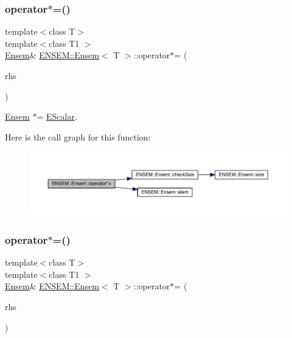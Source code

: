 \subsubsection{\texorpdfstring{operator$\ast$=()}{operator*=()}\hspace{0.1cm}{\footnotesize\ttfamily [1/4]}}
{\footnotesize\ttfamily template$<$class T$>$ \\
template$<$class T1 $>$ \\
\mbox{\hyperlink{classENSEM_1_1Ensem}{Ensem}}\& \mbox{\hyperlink{classENSEM_1_1Ensem}{E\+N\+S\+E\+M\+::\+Ensem}}$<$ T $>$\+::operator$\ast$= (\begin{DoxyParamCaption}\item[{const \mbox{\hyperlink{classENSEM_1_1EScalar}{E\+Scalar}}$<$ T1 $>$ \&}]{rhs }\end{DoxyParamCaption})\hspace{0.3cm}{\ttfamily [inline]}}



\mbox{\hyperlink{classENSEM_1_1Ensem}{Ensem}} $\ast$= \mbox{\hyperlink{classENSEM_1_1EScalar}{E\+Scalar}}. 

Here is the call graph for this function\+:
\nopagebreak
\begin{figure}[H]
\begin{center}
\leavevmode
\includegraphics[width=350pt]{d7/d3e/classENSEM_1_1Ensem_abacb93dfca393ddb29f317d35e2fff7f_cgraph}
\end{center}
\end{figure}
\mbox{\label{classENSEM_1_1Ensem_abacb93dfca393ddb29f317d35e2fff7f}} 
\subsubsection{\texorpdfstring{operator$\ast$=()}{operator*=()}\hspace{0.1cm}{\footnotesize\ttfamily [2/4]}}
{\footnotesize\ttfamily template$<$class T$>$ \\
template$<$class T1 $>$ \\
\mbox{\hyperlink{classENSEM_1_1Ensem}{Ensem}}\& \mbox{\hyperlink{classENSEM_1_1Ensem}{E\+N\+S\+E\+M\+::\+Ensem}}$<$ T $>$\+::operator$\ast$= (\begin{DoxyParamCaption}\item[{const \mbox{\hyperlink{classENSEM_1_1EScalar}{E\+Scalar}}$<$ T1 $>$ \&}]{rhs }\end{DoxyParamCaption})\hspace{0.3cm}{\ttfamily [inline]}}



